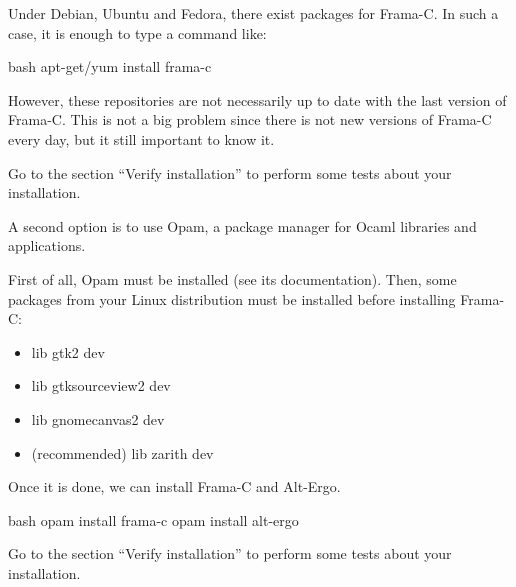 



Under Debian, Ubuntu and Fedora, there exist packages for Frama-C. In
such a case, it is enough to type a command like:



\begin{CodeBlock}{bash}
apt-get/yum install frama-c
\end{CodeBlock}



However, these repositories are not necessarily up to date with the last
version of Frama-C. This is not a big problem since there is not new
versions of Frama-C every day, but it still important to know it.



Go to the section ``Verify installation'' to perform some tests about
your installation.






A second option is to use Opam, a package manager for Ocaml libraries
and applications.



First of all, Opam must be installed (see its documentation). Then, some
packages from your Linux distribution must be installed before
installing Frama-C:



\begin{itemize}
\item lib gtk2 dev
\item lib gtksourceview2 dev
\item lib gnomecanvas2 dev
\item (recommended) lib zarith dev
\end{itemize}



Once it is done, we can install Frama-C and Alt-Ergo.




\begin{CodeBlock}{bash}
opam install frama-c
opam install alt-ergo
\end{CodeBlock}



Go to the section ``Verify installation'' to perform some tests about
your installation.





